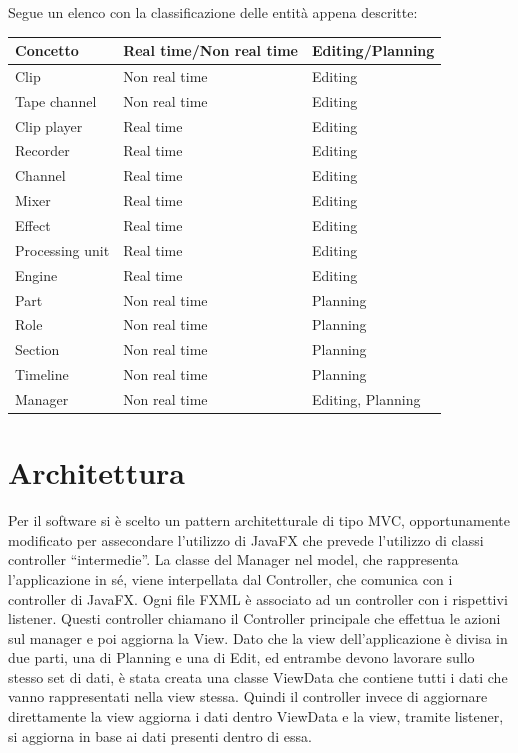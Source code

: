 \documentclass[a4paper,12pt]{report}
\begin{document}
Segue un elenco con la classificazione delle entità appena descritte:
\begin{center}
\begin{longtable}{| m{10em} | m{5cm} | m{4cm} |} 
 \hline
 \textbf{Concetto} & \textbf{Real time/Non real time} & \textbf{Editing/Planning} \\ [0.5ex] 
 \hline
 Clip & Non real time & Editing \\ 
 \hline
 Tape channel & Non real time & Editing \\
 \hline
 Clip player & Real time & Editing \\
 \hline
 Recorder & Real time & Editing \\
 \hline
 Channel & Real time & Editing \\ 
 \hline
 Mixer & Real time & Editing \\
 \hline 
 Effect & Real time & Editing \\
 \hline
 Processing unit & Real time & Editing \\
 \hline
 Engine & Real time & Editing \\
 \hline
 Part & Non real time & Planning \\
 \hline
 Role & Non real time & Planning \\
\hline
 Section & Non real time & Planning \\
\hline
 Timeline & Non real time & Planning \\
\hline
 Manager & Non real time & Editing, Planning \\
\hline
\end{longtable}
\end{center}

\section{Architettura}
Per il software si è scelto un pattern architetturale di tipo MVC, opportunamente modificato per assecondare l’utilizzo di JavaFX che prevede l’utilizzo di classi controller “intermedie”. La classe del Manager nel model, che rappresenta l’applicazione in sé, viene interpellata dal Controller, che comunica con i controller di JavaFX. Ogni file FXML è associato ad un controller con i rispettivi listener. Questi controller chiamano il Controller principale che effettua le azioni sul manager e poi aggiorna la View. Dato che la view dell’applicazione è divisa in due parti, una di Planning e una di Edit, ed entrambe devono lavorare sullo stesso set di dati, è stata creata una classe ViewData che contiene tutti i dati che vanno rappresentati nella view stessa. Quindi il controller invece di aggiornare direttamente la view aggiorna i dati dentro ViewData e la view, tramite listener, si aggiorna in base ai dati presenti dentro di essa.
\end{document}
